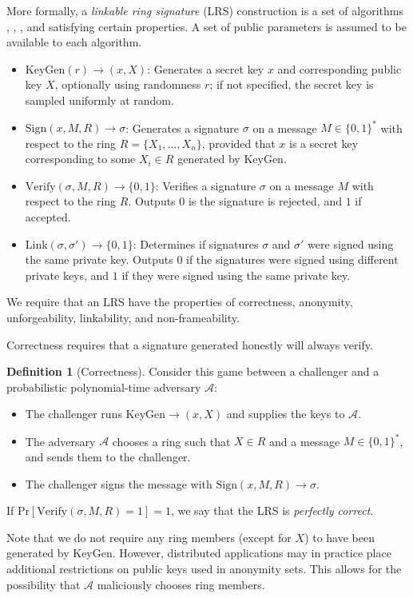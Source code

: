 \documentclass{article}
\newcommand{\A}{\mathcal{A}}
\theoremstyle{definition}
\newtheorem{definition}{Definition}
\begin{document}
More formally, a \textit{linkable ring signature} (LRS) construction is a set of algorithms , , , and  satisfying certain properties.
A set of public parameters is assumed to be available to each algorithm.
\begin{itemize}
\item $\text{KeyGen}(r) \to (x,X)$: Generates a secret key $x$ and corresponding public key $X$, optionally using randomness $r$; if not specified, the secret key is sampled uniformly at random.
\item $\text{Sign}(x,M,R) \to \sigma$: Generates a signature $\sigma$ on a message $M \in \{0,1\}^*$ with respect to the ring $R = \{X_1,\ldots,X_n\}$, provided that $x$ is a secret key corresponding to some $X_i \in R$ generated by $\text{KeyGen}$.
\item $\text{Verify}(\sigma,M,R) \to \{0,1\}$: Verifies a signature $\sigma$ on a message $M$ with respect to the ring $R$.
Outputs $0$ is the signature is rejected, and $1$ if accepted.
\item $\text{Link}(\sigma,\sigma') \to \{0,1\}$: Determines if signatures $\sigma$ and $\sigma'$ were signed using the same private key.
Outputs $0$ if the signatures were signed using different private keys, and $1$ if they were signed using the same private key.
\end{itemize}

We require that an LRS have the properties of correctness, anonymity, unforgeability, linkability, and non-frameability.

Correctness requires that a signature generated honestly will always verify.
\begin{definition}[Correctness]
Consider this game between a challenger and a probabilistic polynomial-time adversary $\A$:
\begin{itemize}
\item The challenger runs $\text{KeyGen} \to (x,X)$ and supplies the keys to $\A$.
\item The adversary $\A$ chooses a ring such that $X \in R$ and a message $M \in \{0,1\}^*$, and sends them to the challenger.
\item The challenger signs the message with $\text{Sign}(x,M,R) \to \sigma$.
\end{itemize}
If $\text{Pr}[ \text{Verify}(\sigma,M,R) = 1 ] = 1$, we say that the LRS is \textit{perfectly correct}.
\end{definition}
Note that we do not require any ring members (except for $X$) to have been generated by $\text{KeyGen}$.
However, distributed applications may in practice place additional restrictions on public keys used in anonymity sets.
This allows for the possibility that $\A$ maliciously chooses ring members.
\end{document}
